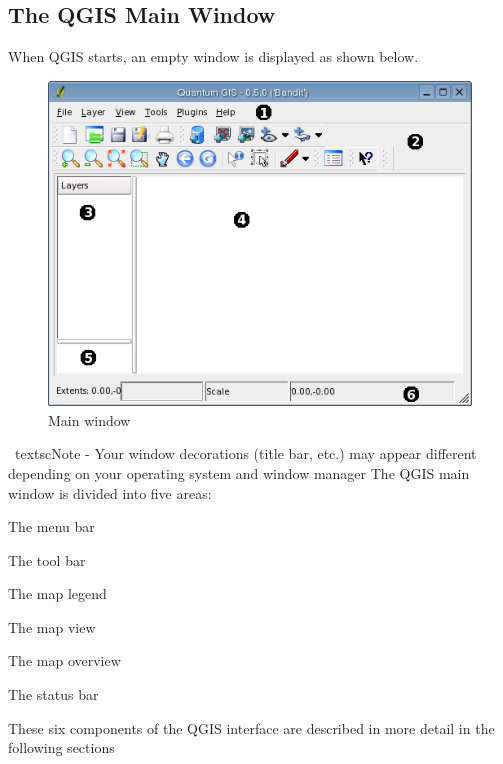 \documentclass[10pt,english]{article}
\begin{document}
\begin{onehalfspace}
\subsection{The QGIS Main Window}
When QGIS starts, an empty window is displayed as shown below.

\begin{figure}[h]
   \begin{center}
   \caption{Main window}\label{fig:startup}
   \includegraphics[scale=.9]{qgis_user_guide_images/startup}
\end{center}  
   
\end{figure}
\
textsc{Note - Your window decorations (title bar, etc.) may appear different depending on your operating system and window manager}
The QGIS main window is divided into five areas:
\begin{compactenum}
\item The menu bar
\item The tool bar
\item The map legend
\item The map view
\item The map overview
\item The status bar
\end{compactenum}

These six components of the QGIS interface are described in more detail in the following sections

\end{onehalfspace}
\end{document}
